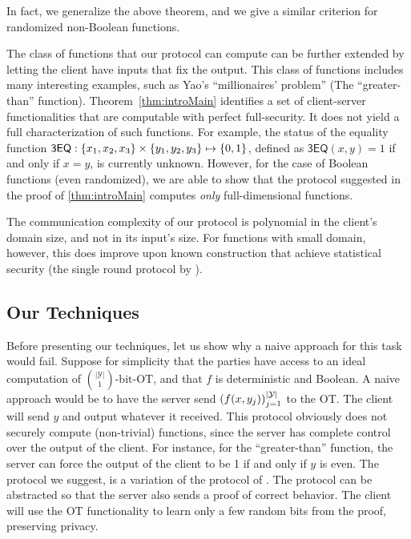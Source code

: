 \documentclass{llncs}
\newcommand{\bOT}[2]{\binom{#2}{#1}\text{-bit-OT}}
\newcommand{\Y}{\mathcal{Y}}
\begin{document}
In fact, we generalize the above theorem, and we give a similar criterion for randomized non-Boolean functions.

The class of functions that our protocol can compute can be further extended by letting the client have inputs that fix the output. This class of functions includes many interesting examples, such as Yao's ``millionaires' problem'' (The ``greater-than'' function). Theorem~\ref{thm:introMain} identifies a set of client-server functionalities that are computable with perfect full-security. It does not yield a full characterization of such functions. For example, the status of the equality function $\mathsf{3EQ}:\left\{x_1,x_2,x_3\right\}\times\left\{y_1,y_2,y_3\right\}\mapsto\{0,1\}$, defined as $\mathsf{3EQ}(x,y)=1$ if and only if $x=y$, is currently unknown. However, for the case of Boolean functions (even randomized), we are able to show that the protocol suggested in the proof of \cref{thm:introMain} computes \emph{only} full-dimensional functions.

The communication complexity of our protocol is polynomial in the client's domain size, and not in its input's size. For functions with small domain, however, this does improve upon known construction that achieve statistical security (\eg the single round protocol by \citet{IKOPS11}).


\subsection{Our Techniques}
Before presenting our techniques, let us show why a naive approach for this task would fail. Suppose for simplicity that the parties have access to an ideal computation of $\bOT{1}{|\Y|}$, and that $f$ is deterministic and Boolean. A naive approach would be to have the server send $\vect{f(x,y_j)}_{j=1}^{|\Y|}$ to the OT. The client will send $y$ and output whatever it received. This protocol obviously does not securely compute (non-trivial) functions, since the server has complete control over the output of the client. For instance, for the ``greater-than'' function, the server can force the output of the client to be 1 if and only if $y$ is even. The protocol we suggest, is a variation of the protocol of \citet{IKOPS11}. The protocol can be abstracted so that the server also sends a proof of correct behavior. The client will use the OT functionality to learn only a few random bits from the proof, preserving privacy.
\end{document}
